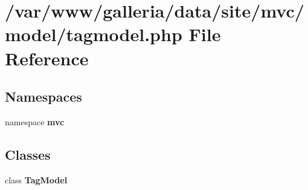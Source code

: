 \section{/var/www/galleria/data/site/mvc/model/tagmodel.php File Reference}
\label{tagmodel_8php}
\subsection*{Namespaces}
\begin{CompactItemize}
\item 
namespace {\bf mvc}
\end{CompactItemize}
\subsection*{Classes}
\begin{CompactItemize}
\item 
class {\bf TagModel}
\end{CompactItemize}

